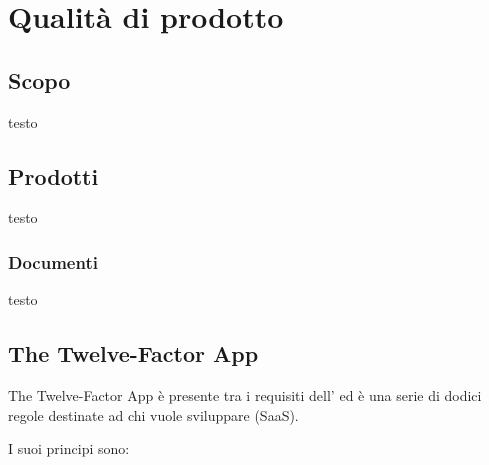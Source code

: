 \section{Qualità di prodotto}

\subsection{Scopo}
testo

\subsection{Prodotti}
testo

	\subsubsection{Documenti}
	testo

\subsection{The Twelve-Factor App}
The Twelve-Factor App è presente tra i requisiti dell' ed è una serie di dodici regole destinate ad chi vuole sviluppare  (SaaS).

I suoi principi sono:

